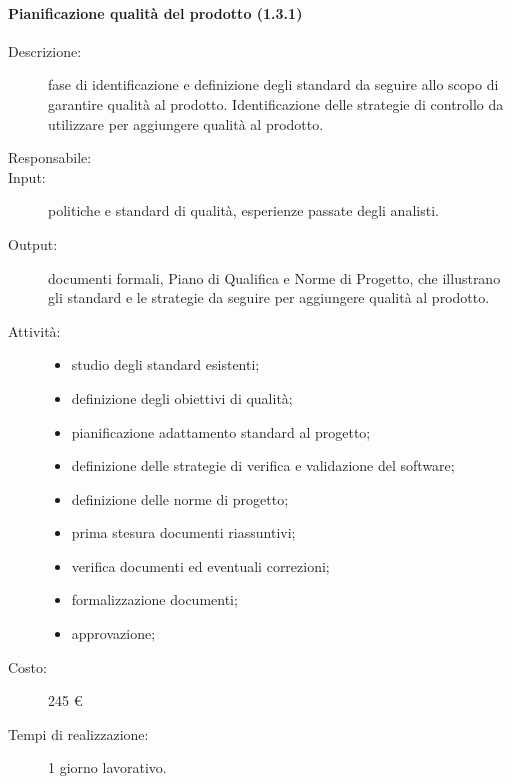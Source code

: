 \paragraph{Pianificazione qualità del prodotto (1.3.1)}
\begin{description}
\item[Descrizione:] fase di identificazione e definizione degli standard da seguire allo scopo di garantire qualità al prodotto. Identificazione delle strategie di controllo da utilizzare per aggiungere qualità al prodotto.
\item[Responsabile:] 
\item[Input:] politiche e standard di qualità, esperienze passate degli analisti.
\item[Output:] documenti formali, Piano di Qualifica e Norme di Progetto, che illustrano gli standard e le strategie da seguire per aggiungere qualità al prodotto.
\item[Attività:] 
\begin{center}
\begin{itemize}
\item studio degli standard esistenti;
\item definizione degli obiettivi di qualità;
\item pianificazione adattamento standard al progetto;
\item definizione delle strategie di verifica e validazione del software;
\item definizione delle norme di progetto;
\item prima stesura documenti riassuntivi;
\item verifica documenti ed eventuali correzioni;
\item formalizzazione documenti;
\item approvazione;
\end{itemize}
\end{center}
\item[Costo:] 245 \euro{}
\item[Tempi di realizzazione:] 1 giorno lavorativo.
\end{description}


